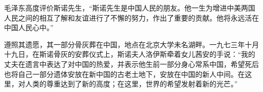 \begin{maonote}
毛泽东高度评价斯诺先生，“斯诺先生是中国人民的朋友。他一生为增进中美两国人民之间的相互了解和友谊进行了不懈的努力，作出了重要的贡献。他将永远活在中国人民心中。”

遵照其遗愿，其一部分骨灰葬在中国，地点在北京大学未名湖畔。一九七三年十月十九日，在斯诺骨灰的安葬仪式上，斯诺夫人洛伊斯牵着女儿茜安的手说：“我的丈夫在遗言中表达了对中国的热爱，并表示他生前一部分身心常系中国，希望死后也将自己一部分遗体安放在新中国的古老土地下，安放在中国的新人中间。在这里，对人类的尊重达到了新的高度；在这里，世界的希望发射着新的光芒。”
\end{maonote}
